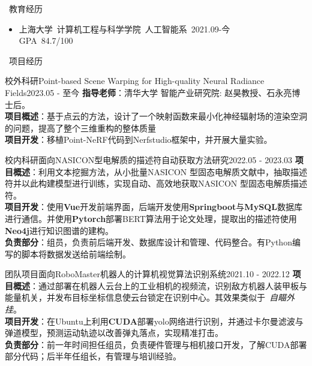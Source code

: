 \documentclass[UTF8]{resume}
\begin{document}
\begin{rSection}{\faGraduationCap~教育经历}
    \begin{itemize}
        \item 上海大学~计算机工程与科学学院~人工智能系~\hfill 2021.09-今 \\ GPA~84.7/100
    \end{itemize}
\end{rSection}
 

\begin{rSection}{\faUsers~项目经历}
    \begin{rProject}{校外科研}{Point-based Scene Warping for High-quality Neural Radiance Fields}{2023.05 - 至今}
        \textbf{指导老师}：清华大学 智能产业研究院: 赵昊教授、石永亮博士后。\\
        \textbf{项目概述}：基于点云的方法，设计了一个映射函数来最小化神经辐射场的渲染空洞的问题，提高了整个三维重构的整体质量\\
        \textbf{项目开发}：移植Point-NeRF代码到Nerfstudio框架中，并开展大量实验。\\
    \end{rProject}

    \begin{rProject}{校内科研}{面向NASICON型电解质的描述符自动获取方法研究}{2022.05 - 2023.03}
        \textbf{项目概述}：利用文本挖掘方法，从小批量NASICON 型固态电解质文献中，抽取描述符并以此构建模型进行训练，实现自动、高效地获取NASICON 型固态电解质描述符。\\
        \textbf{项目开发}：使用\textbf{Vue}开发前端界面，后端开发使用\textbf{Springboot}与\textbf{MySQL}数据库进行通信。并使用\textbf{Pytorch}部署BERT算法用于论文处理，提取出的描述符使用\textbf{Neo4j}进行知识图谱的建构。\\
        \textbf{负责部分}：组员，负责前后端开发、数据库设计和管理、代码整合。有Python编写的脚本将数据发送给前端绘制。
    \end{rProject}

    \begin{rProject}{团队项目}{面向RoboMaster机器人的计算机视觉算法识别系统}{2021.10 - 2022.12}
        \textbf{项目概述}：通过部署在机器人云台上的工业相机的视频流，识别敌方机器人装甲板与能量机关，并发布目标坐标信息使云台锁定在识别中心。其效果类似于~\textit{自瞄外挂}。\\
        \textbf{项目开发}：在Ubuntu上利用\textbf{CUDA}部署yolo网络进行识别，并通过卡尔曼滤波与弹道模型，预测运动轨迹以改善弹丸落点，实现精准打击。\\
        \textbf{负责部分}：前一年时间担任组员，负责硬件管理与相机接口开发，了解CUDA部署部分代码；后半年任组长，有管理与培训经验。
    \end{rProject}
\end{rSection}
\end{document}
